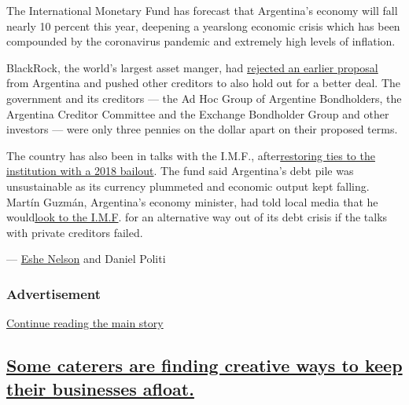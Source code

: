 The International Monetary Fund has forecast that Argentina's economy
will fall nearly 10 percent this year, deepening a yearslong economic
crisis which has been compounded by the coronavirus pandemic and
extremely high levels of inflation.

BlackRock, the world's largest asset manger, had
\href{https://www.nytimes3xbfgragh.onion/2020/07/31/business/argentina-debt.html}{rejected
an earlier proposal} from Argentina and pushed other creditors to also
hold out for a better deal. The government and its creditors --- the Ad
Hoc Group of Argentine Bondholders, the Argentina Creditor Committee and
the Exchange Bondholder Group and other investors --- were only three
pennies on the dollar apart on their proposed terms.

The country has also been in talks with the I.M.F.,
after\href{https://qz.com/1274875/how-argentina-went-from-selling-100-year-bonds-to-an-imf-rescue-in-a-matter-of-months/}{restoring
ties to the institution with a 2018 bailout}. The fund said Argentina's
debt pile was unsustainable as its currency plummeted and economic
output kept falling. Martín Guzmán, Argentina's economy minister, had
told local media that he
would\href{https://www.pagina12.com.ar/282488-deuda-la-ultima-oferta-y-el-mensaje-de-martin-guzman}{look
to the I.M.F}. for an alternative way out of its debt crisis if the
talks with private creditors failed.

--- \href{https://www.nytimes3xbfgragh.onion/by/eshe-nelson}{Eshe
Nelson} and Daniel Politi

\hypertarget{advertisement-2}{%
\subsubsection{Advertisement}\label{advertisement-2}}

\protect\hyperlink{after-dfp-ad-mid3}{Continue reading the main story}

\hypertarget{some-caterers-are-finding-creative-ways-to-keep-their-businesses-afloat}{%
\subsection{\texorpdfstring{\protect\hyperlink{some-caterers-are-finding-creative-ways-to-keep-their-businesses-afloat}{Some
caterers are finding creative ways to keep their businesses
afloat.}}{Some caterers are finding creative ways to keep their businesses afloat.}}\label{some-caterers-are-finding-creative-ways-to-keep-their-businesses-afloat}}

